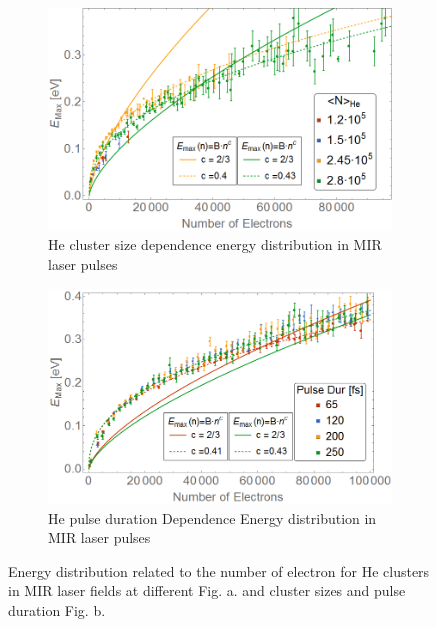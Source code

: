  \begin{figure}[h!]
\hfill
\begin{subfigure}[l]{0.48\textwidth}
\caption{He cluster size dependence energy distribution in MIR laser pulses}
\includegraphics[width=1\textwidth]{../Images/results/Mir_He_Dropletsize/binned.png} 
\end{subfigure} 
\begin{subfigure}[l]{0.48\textwidth}
\caption{He pulse duration Dependence Energy distribution in MIR laser pulses}
\includegraphics[width=1\textwidth]{../Images/results/MIR_He_pulsescan/raw/binned.png} 
\end{subfigure} 
\hfill
\caption[Energy-Number of electrons relation. MIR helium droplets]{Energy distribution related to the number of electron for He clusters in MIR laser fields at different Fig. a. and cluster sizes and pulse duration Fig. b.}
\label{fig:Heenrgd}
\end{figure}

